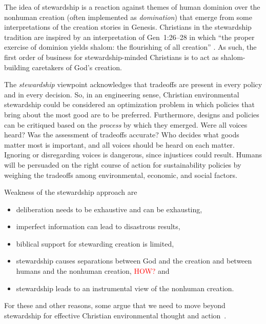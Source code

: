 \documentclass[12pt]{article}
\newcommand{\ins}[1]{\textcolor{red}{#1}}
\begin{document}
The idea of stewardship is a reaction 
against themes of human dominion over the nonhuman creation
(often implemented as \emph{domination})
that emerge from some interpretations of the creation stories in Genesis.
Christians in the stewardship tradition are inspired by an interpretation of Gen~1:26–28 in which 
``the proper exercise of dominion yields shalom: the flourishing of all creation'' \autocite{BoumaPrediger:2019}.
As such, the first order of business for stewardship-minded Christians
is to act as shalom-building caretakers of God's creation.

The \emph{stewardship} viewpoint acknowledges that tradeoffs
are present in every policy and in every decision. 
So, in an engineering sense, 
Christian environmental stewardship could be considered an optimization problem
in which policies that bring about the most good 
are to be preferred.
Furthermore, designs and policies can be critiqued 
based on the \emph{process} by which they emerged.
Were all voices heard? Was the assessment of tradeoffs accurate?
Who decides what goods matter most is important, and 
all voices should be heard on each matter.
Ignoring or disregarding voices is dangerous,
since injustices could result.
Humans will be persuaded on the right course of action
for sustainability policies by weighing the tradeoffs 
among environmental, economic, and social factors.

Weakness of the stewardship approach are
%
\begin{itemize}

  \item deliberation needs to be exhaustive and can be exhausting,

  \item imperfect information can lead to disastrous results,
  
  \item biblical support for stewarding creation is limited,
  
  \item stewardship causes separations between God and the creation and between 
        humans and the nonhuman creation, \ins{HOW?} and
		
  \item stewardship leads to an instrumental view of the nonhuman creation.

\end{itemize}

For these and other reasons, some argue that we need to move beyond stewardship 
for effective Christian environmental thought and action~\autocite{WarnersHeun:2019aa}.
\end{document}
